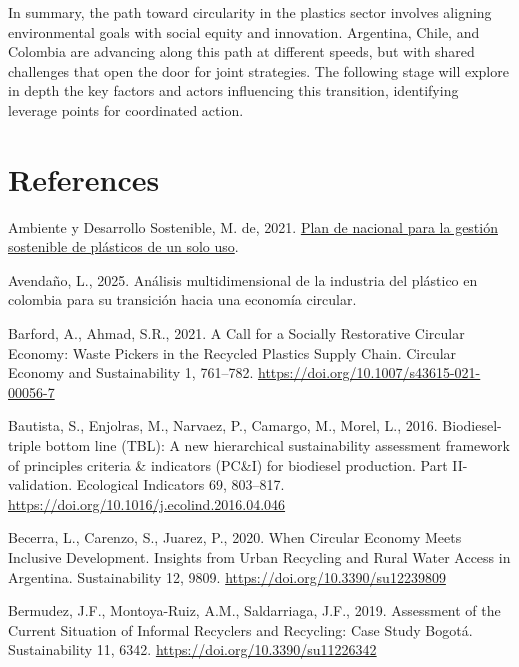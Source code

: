 \documentclass[
  12pt,
  oneside]{book}
\newlength{\cslhangindent}
\newenvironment{CSLReferences}[2] %
 {\begin{list}{}{%
  \setlength{\itemindent}{0pt}
  \setlength{\leftmargin}{0pt}
  \setlength{\parsep}{0pt}
  \ifodd #1
   \setlength{\leftmargin}{\cslhangindent}
   \setlength{\itemindent}{-1\cslhangindent}
  \fi
  \setlength{\itemsep}{#2\baselineskip}}}
 {\end{list}}
\begin{document}
In summary, the path toward circularity in the plastics sector involves
aligning environmental goals with social equity and innovation.
Argentina, Chile, and Colombia are advancing along this path at
different speeds, but with shared challenges that open the door for
joint strategies. The following stage will explore in depth the key
factors and actors influencing this transition, identifying leverage
points for coordinated action.

\chapter{References}\label{references}

\protect{}\label{refs}
\begin{CSLReferences}{1}{0}
Ambiente y Desarrollo Sostenible, M. de, 2021.
\href{https://www.minambiente.gov.co/consulta/plan-nacional-para-la-gestion-sostenible-de-los-plasticos-de-un-solo-uso/}{Plan
de nacional para la gestión sostenible de plásticos de un solo uso}.

Avendaño, L., 2025. Análisis multidimensional de la industria del
plástico en colombia para su transición hacia una economía circular.

Barford, A., Ahmad, S.R., 2021. A {Call} for a {Socially Restorative
Circular Economy}: {Waste Pickers} in the {Recycled Plastics Supply
Chain}. Circular Economy and Sustainability 1, 761--782.
\url{https://doi.org/10.1007/s43615-021-00056-7}

Bautista, S., Enjolras, M., Narvaez, P., Camargo, M., Morel, L., 2016.
Biodiesel-triple bottom line ({TBL}): {A} new hierarchical
sustainability assessment framework of principles criteria \& indicators
({PC}\&{I}) for biodiesel production. {Part II-validation}. Ecological
Indicators 69, 803--817.
\url{https://doi.org/10.1016/j.ecolind.2016.04.046}

Becerra, L., Carenzo, S., Juarez, P., 2020. When {Circular Economy Meets
Inclusive Development}. {Insights} from {Urban Recycling} and {Rural
Water Access} in {Argentina}. Sustainability 12, 9809.
\url{https://doi.org/10.3390/su12239809}

Bermudez, J.F., Montoya-Ruiz, A.M., Saldarriaga, J.F., 2019. Assessment
of the {Current Situation} of {Informal Recyclers} and {Recycling}:
{Case Study Bogot{á}}. Sustainability 11, 6342.
\url{https://doi.org/10.3390/su11226342}


\end{CSLReferences}
\end{document}
